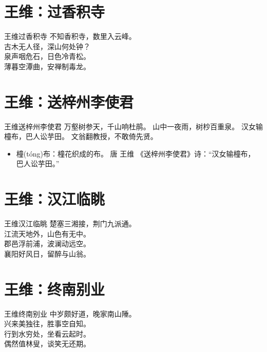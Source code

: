 \documentclass[12pt,oneside,a5paper]{book}
\begin{document}
\chapter{王维：过香积寺}
\begin{poemzh}{王维}{过香积寺}
不知香积寺，数里入云峰。\\
古木无人径，深山何处钟？\\
泉声咽危石，日色冷青松。\\
薄暮空潭曲，安禅制毒龙。\\ 
\end{poemzh}

\chapter{王维：送梓州李使君}
\begin{poemzh}{王维}{送梓州李使君}
万壑树参天，千山响杜鹃。
山中一夜雨，树杪百重泉。
汉女输橦布，巴人讼芋田。
文翁翻教授，不敢倚先贤。\\ 
\end{poemzh}

\begin{itemize}
\item 橦(tóng)布：橦花织成的布。 唐 王维 《送梓州李使君》诗：“汉女输橦布， 巴人讼芋田。”
\end{itemize}


\chapter{王维：汉江临眺}
\begin{poemzh}{王维}{汉江临眺}
楚塞三湘接，荆门九派通。\\
江流天地外，山色有无中。\\
郡邑浮前浦，波澜动远空。\\
襄阳好风日，留醉与山翁。\\ 
\end{poemzh}

\chapter{王维：终南别业}
\begin{poemzh}{王维}{终南别业}
中岁颇好道，晚家南山陲。\\
兴来美独往，胜事空自知。\\
行到水穷处，坐看云起时。\\
偶然值林叟，谈笑无还期。\\ 
\end{poemzh}
\end{document}
